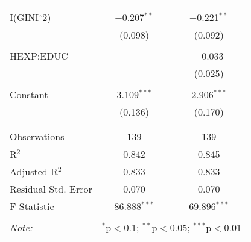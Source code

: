 \documentclass[12pt,a4paper]{article}\usepackage[]{graphicx}\usepackage[]{color}
\begin{document}
\begin{table}[!htbp]
\begin{tabular}{@{\extracolsep{5pt}}lcc}
  & & \\ 
 I(GINI$\hat{\mkern6mu}$2) & $-$0.207$^{**}$ & $-$0.221$^{**}$ \\ 
  & (0.098) & (0.092) \\ 
  & & \\ 
 HEXP:EDUC &  & $-$0.033 \\ 
  &  & (0.025) \\ 
  & & \\ 
 Constant & 3.109$^{***}$ & 2.906$^{***}$ \\ 
  & (0.136) & (0.170) \\ 
  & & \\ 
\hline \\[-1.8ex] 
Observations & 139 & 139 \\ 
R$^{2}$ & 0.842 & 0.845 \\ 
Adjusted R$^{2}$ & 0.833 & 0.833 \\ 
Residual Std. Error & 0.070 & 0.070 \\ 
F Statistic & 86.888$^{***}$ & 69.896$^{***}$ \\ 
\hline 
\hline \\[-1.8ex] 
\textit{Note:}  & \multicolumn{2}{r}{$^{*}$p$<$0.1; $^{**}$p$<$0.05; $^{***}$p$<$0.01} \\ 
\end{tabular} 
\end{table} 
\end{document}
